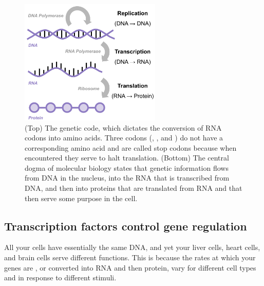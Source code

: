 \begin{figure}[hp]
\vspace{8ex}

\includegraphics[width = 0.6\textwidth]{../images/central_dogma.png}
\caption{(Top) The genetic code, which dictates the conversion of RNA codons into amino acids. Three codons (, , and ) do not have a corresponding amino acid and are called stop codons because when encountered they serve to halt translation. (Bottom) The central dogma of molecular biology states that genetic information flows from DNA in the nucleus, into the RNA that is transcribed from DNA, and then into proteins that are translated from RNA and that then serve some purpose in the cell.}
\label{fig:central_dogma}
\end{figure}


\subsection{Transcription factors control gene regulation}

All your cells have essentially the same DNA, and yet your liver cells, heart cells, and brain cells serve different functions. This is because the rates at which your genes are , or converted into RNA and then protein, vary for different cell types and in response to different stimuli.


